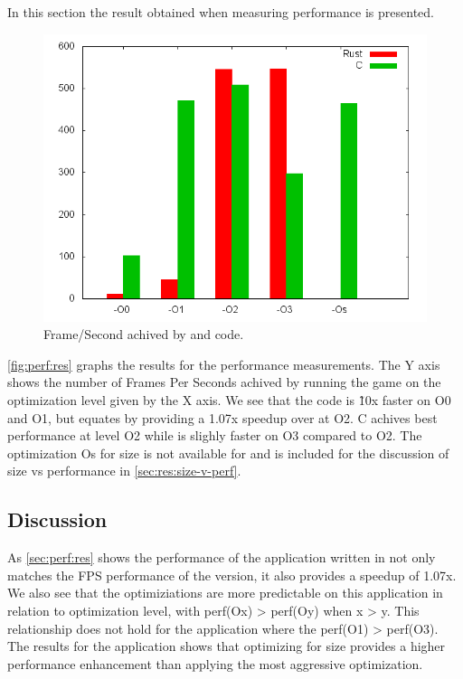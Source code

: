In this section the result obtained when measuring performance is presented.

\begin{figure}[H]
  \begin{center}
    \includegraphics[scale=0.5]{results/plots/perf/perf.png}
  \end{center}
  \caption{Frame/Second achived by {\C} and {\rust} code.}
  \label{fig:perf:res}
\end{figure}

\autoref{fig:perf:res} graphs the results for the performance measurements.
The Y axis shows the number of Frames Per Seconds achived by running the game on the optimization level given by the X axis.
We see that the {\C} code is \~10x faster on O0 and O1, but {\rust} equates by providing a 1.07x speedup over {\C} at O2.
C achives best performance at level O2 while {\rust} is slighly faster on O3 compared to O2.
The optimization Os for size is not available for {\rust} and is included for the discussion of size vs performance in \autoref{sec:res:size-v-perf}.

\subsection{Discussion}
\label{sec:perf:disc}
As \autoref{sec:perf:res} shows the performance of the application written in {\rust} not only matches the FPS performance of the {\C} version, it also provides a speedup of 1.07x.
We also see that the optimiziations are more predictable on this application in relation to optimization level, with perf(Ox) > perf(Oy) when x > y.
This relationship does not hold for the {\C} application where the perf(O1) > perf(O3).
The results for the {\C} application shows that optimizing for size provides a higher performance enhancement than applying the most aggressive optimization.
